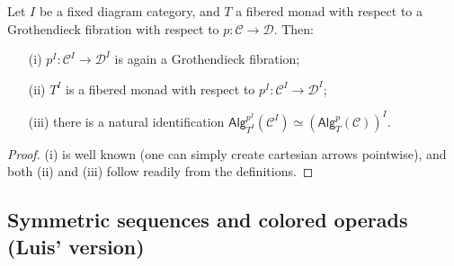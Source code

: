 \documentclass[a4paper,10pt
,draft
]{article}%
\renewcommand{\1}{\eta}%
\begin{document}
\begin{proposition}
Let $I$ be a fixed diagram category, and $T$ a fibered monad with respect to a Grothendieck fibration with respect to
$p\colon \mathcal{C} \to \mathcal{D}$. Then:
\begin{itemize}
\item[(i)] $p^I\colon \mathcal{C}^I \to \mathcal{D}^I$ is again a Grothendieck fibration;
\item[(ii)] $T^I$ is a fibered monad with respect to $p^I\colon \mathcal{C}^I \to \mathcal{D}^I$;
\item[(iii)] there is a natural identification 
$\mathsf{Alg}_{T^I}^{p^I}(\mathcal{C}^I)\simeq
\left(\mathsf{Alg}_T^p(\mathcal{C})\right)^I$.
\end{itemize}
\end{proposition}

\begin{proof}
(i) is well known (one can simply create cartesian arrows pointwise), and both (ii) and (iii) follow readily from the definitions.
\end{proof}



\subsection{Symmetric sequences and colored operads (Luis' version)}
\end{document}
